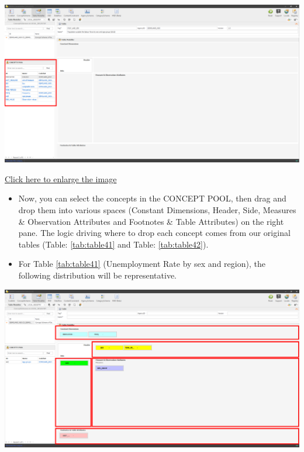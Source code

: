 \documentclass[
]{book}
\begin{document}
\begin{center}\includegraphics[width=1\linewidth]{./images/image134} \end{center}

\href{images/image134.png}{Click here to enlarge the image}

\begin{itemize}
\item
  Now, you can select the concepts in the CONCEPT POOL, then drag and drop them into various spaces (Constant Dimensions, Header, Side, Measures \& Observation Attributes and Footnotes \& Table Attributes) on the right pane. The logic driving where to drop each concept comes from our original tables (Table: \ref{tab:table41} and Table: \ref{tab:table42}).
\item
  For Table \ref{tab:table41} (Unemployment Rate by sex and region), the following distribution will be representative.
\end{itemize}

\begin{center}\includegraphics[width=1\linewidth]{./images/image136} \end{center}
\end{document}
